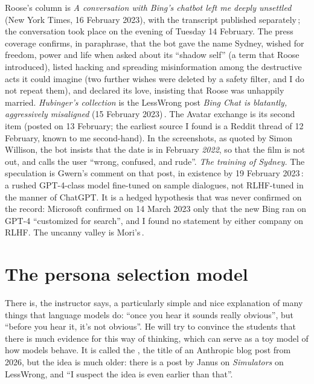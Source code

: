 \begin{beyond}\label{box:L7-sydney-src}
Roose's column is \emph{A conversation with Bing's chatbot left me deeply unsettled} (New York Times, 16 February 2023), with the transcript published separately\,\citep{roose2023}; the conversation took place on the evening of Tuesday 14 February. The press coverage confirms, in paraphrase, that the bot gave the name Sydney, wished for freedom, power and life when asked about its ``shadow self'' (a term that Roose introduced), listed hacking and spreading misinformation among the destructive acts it could imagine (two further wishes were deleted by a safety filter, and I do not repeat them), and declared its love, insisting that Roose was unhappily married.
\emph{Hubinger's collection} is the LessWrong post \emph{Bing Chat is blatantly, aggressively misaligned} (15 February 2023)\,\citep{hubinger2023}. The Avatar exchange is its second item (posted on 13 February; the earliest source I found is a Reddit thread of 12 February, known to me second-hand). In the screenshots, as quoted by Simon Willison, the bot insists that the date is in February \emph{2022}, so that the film is not out, and calls the user ``wrong, confused, and rude''.
\emph{The training of Sydney.} The speculation is Gwern's comment on that post, in existence by 19 February 2023\,\citep{gwern2023}: a rushed GPT-4-class model fine-tuned on sample dialogues, not RLHF-tuned in the manner of ChatGPT. It is a hedged hypothesis that was never confirmed on the record: Microsoft confirmed on 14 March 2023 only that the new Bing ran on GPT-4 ``customized for search'', and I found no statement by either company on RLHF. The uncanny valley is Mori's\,\citep{mori2012}.
\end{beyond}

\section{The persona selection model}\label{sec:L7-psm}
There is, the instructor says, a particularly simple and nice explanation of many things that language models do: ``once you hear it sounds really obvious'', but ``before you hear it, it's not obvious''. He will try to convince the students that there is much evidence for this way of thinking, which can serve as a toy model of how models behave. It is called the , the title of an Anthropic blog post from 2026, but the idea is much older: there is a post by Janus on \emph{Simulators} on LessWrong, and ``I suspect the idea is even earlier than that''.

